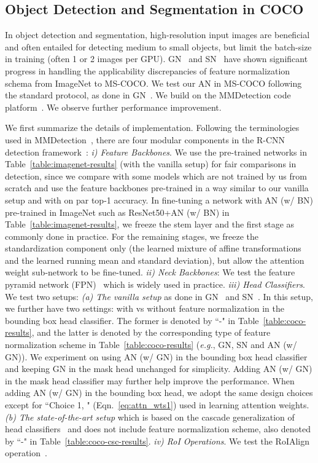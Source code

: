 \documentclass[runningheads]{llncs}
\newcommand{\eg}{\emph{e.g.}}
\begin{document}
\subsection{Object Detection and Segmentation in COCO}
In object detection and segmentation, high-resolution input images are beneficial and often entailed for detecting medium to small objects, but limit the batch-size in training (often 1 or 2 images per GPU). GN~\cite{GroupNorm} and SN~\cite{SwitchNorm} have shown significant progress in handling the applicability discrepancies of feature normalization schema from ImageNet to MS-COCO.    
{We test our AN in MS-COCO following the standard protocol, as done in GN~\cite{GroupNorm}. We build on the MMDetection code platform~\cite{mmdetection}. We observe further performance improvement.} 

We first summarize the details of implementation. Following the terminologies used in MMDetection~\cite{mmdetection}, there are four modular components in the R-CNN detection framework~\cite{FastRCNN,FasterRCNN,maskrcnn}: 
\textit{i) Feature Backbones}. We use the pre-trained networks in Table~\ref{table:imagenet-results} (with the vanilla setup) for fair comparisons in detection, since we compare with some models which are not trained by us from scratch and use the feature backbones pre-trained in a way similar to our vanilla setup and with on par top-1 accuracy. In fine-tuning a network with AN (w/ BN) pre-trained in ImageNet such as ResNet50+AN (w/ BN) in Table~\ref{table:imagenet-results}, we freeze the stem layer and the first stage as commonly done in practice. For the remaining stages, we freeze the standardization component only (the learned mixture of affine transformations and the learned running mean and standard deviation), but allow the attention weight sub-network to be fine-tuned. 
\textit{ii) Neck Backbones}: We test the feature pyramid network (FPN)~\cite{FPN} which is widely used in practice. 
\textit{iii) Head Classifiers}. We test two setups: 
   \textit{ (a) The vanilla setup} as done in GN~\cite{GroupNorm} and SN~\cite{SwitchNorm}. In this setup, we further have two settings: with vs without feature normalization in the bounding box head classifier. The former is denoted by ``-" in Table~\ref{table:coco-results}, and the latter is denoted by the corresponding type of feature normalization scheme in Table~\ref{table:coco-results} (\eg, GN, SN and AN (w/ GN)). We experiment on using AN (w/ GN) in the bounding box head classifier and keeping GN in the mask head unchanged for simplicity. Adding AN (w/ GN) in the mask head classifier may further help improve the performance. When adding AN (w/ GN) in the bounding box head, we adopt the same design choices except for ``Choice 1, " (Eqn.~\ref{eq:attn_wts1}) used in learning attention weights.  
    \textit{(b) The state-of-the-art setup } which is based on the cascade generalization of head classifiers~\cite{cascadercnn} and does not include feature normalization scheme, also denoted by ``-" in Table~\ref{table:coco-csc-results}.  
\textit{iv) RoI Operations}. We test the RoIAlign operation~\cite{maskrcnn}. 
\end{document}

